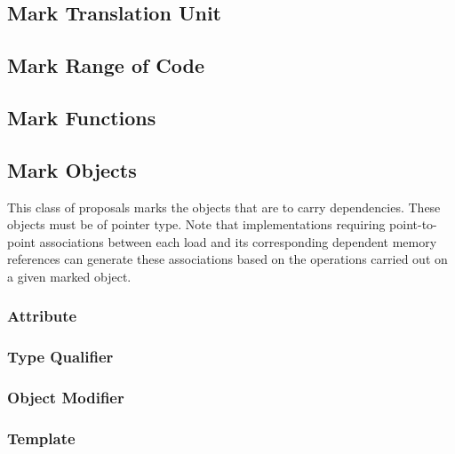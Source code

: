 \documentclass[letterpaper,10pt]{article}
\begin{document}
\subsection{Mark Translation Unit}
\label{sec:Mark Translation Unit}



\subsection{Mark Range of Code}
\label{sec:Mark Range of Code}



\subsection{Mark Functions}
\label{sec:Mark Functions}



\subsection{Mark Objects}
\label{sec:Mark Objects}

This class of proposals marks the objects that are to carry dependencies.
These objects must be of pointer type.
Note that implementations requiring point-to-point associations between
each  load and its corresponding dependent
memory references can generate these associations based on the
operations carried out on a given marked object.

\subsubsection{Attribute}
\label{sec:Attribute}



\subsubsection{Type Qualifier}
\label{sec:Type Qualifier}



\subsubsection{Object Modifier}
\label{sec:Object Modifier}



\subsubsection{Template}
\label{sec:Template}
\end{document}
